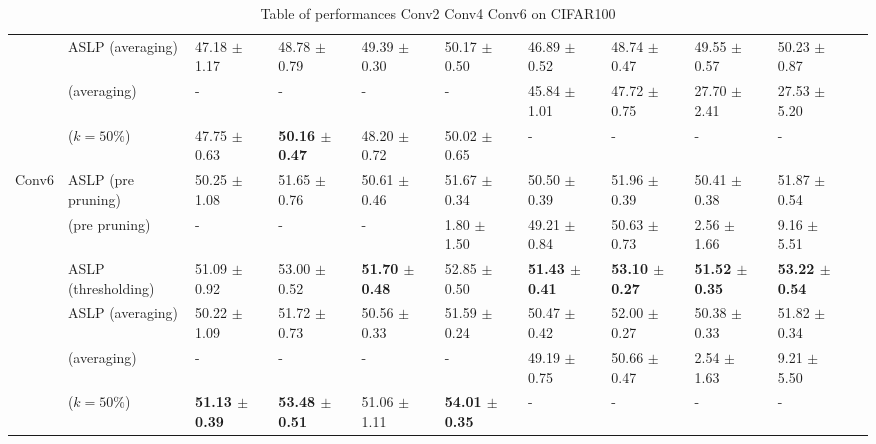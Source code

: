 \begin{table}
{\begin{tabular}{lllllllllll}
      & ASLP (averaging) & 47.18 $\pm$ 1.17 & 48.78 $\pm$ 0.79 & 49.39 $\pm$ 0.30 & 50.17 $\pm$ 0.50 & 46.89 $\pm$ 0.52 & 48.74 $\pm$ 0.47 & 49.55 $\pm$ 0.57 & 50.23 $\pm$ 0.87 \\
      & \cite{DBLP:conf/nips/ZhouLLY19} (averaging) & - & - & - & - & 45.84 $\pm$ 1.01 & 47.72 $\pm$ 0.75 & 27.70 $\pm$ 2.41 & 27.53 $\pm$ 5.20 \\
      & \cite{DBLP:conf/cvpr/RamanujanWKFR20} ($k=50\%$) & 47.75 $\pm$ 0.63 & \textbf{50.16 $\pm$ 0.47} & 48.20 $\pm$ 0.72 & 50.02 $\pm$ 0.65 & - & - & - & - \\
      \midrule
      \multirow{6}{*}{Conv6} & ASLP (pre pruning) & 50.25 $\pm$ 1.08 & 51.65 $\pm$ 0.76 & 50.61 $\pm$ 0.46 & 51.67 $\pm$ 0.34 & 50.50 $\pm$ 0.39 & 51.96 $\pm$ 0.39 & 50.41 $\pm$ 0.38 & 51.87 $\pm$ 0.54 \\
      & \cite{DBLP:conf/nips/ZhouLLY19} (pre pruning) & - & - & - & 1.80 $\pm$ 1.50 & 49.21 $\pm$ 0.84 & 50.63 $\pm$ 0.73 & 2.56 $\pm$ 1.66 & 9.16 $\pm$ 5.51 \\
      \cmidrule(lr){2-10}
      & ASLP (thresholding) & 51.09 $\pm$ 0.92 & 53.00 $\pm$ 0.52 & \textbf{51.70 $\pm$ 0.48} & 52.85 $\pm$ 0.50 & \textbf{51.43 $\pm$ 0.41} & \textbf{53.10 $\pm$ 0.27} & \textbf{51.52 $\pm$ 0.35} & \textbf{53.22 $\pm$ 0.54} \\
      & ASLP (averaging) & 50.22 $\pm$ 1.09 & 51.72 $\pm$ 0.73 & 50.56 $\pm$ 0.33 & 51.59 $\pm$ 0.24 & 50.47 $\pm$ 0.42 & 52.00 $\pm$ 0.27 & 50.38 $\pm$ 0.33 & 51.82 $\pm$ 0.34 \\
      & \cite{DBLP:conf/nips/ZhouLLY19} (averaging) & - & - & - & - & 49.19 $\pm$ 0.75 & 50.66 $\pm$ 0.47 & 2.54 $\pm$ 1.63 & 9.21 $\pm$ 5.50 \\
      & \cite{DBLP:conf/cvpr/RamanujanWKFR20} ($k=50\%$) & \textbf{51.13 $\pm$ 0.39} & \textbf{53.48 $\pm$ 0.51} & 51.06 $\pm$ 1.11 & \textbf{54.01 $\pm$ 0.35} & - & - & - & - \\
      \bottomrule
    \end{tabular}
  }
  \caption{Table of performances Conv2 Conv4 Conv6 on CIFAR100}
\end{table}

